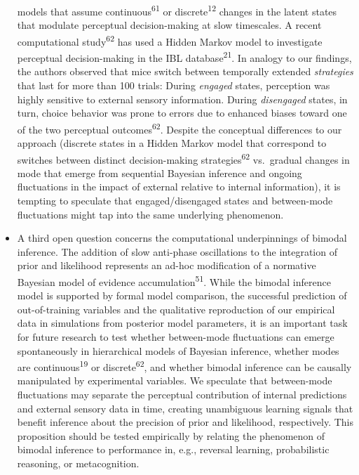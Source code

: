 \documentclass[
]{article}
\begin{document}
\begin{itemize}
  models that assume continuous\textsuperscript{61} or
  discrete\textsuperscript{12} changes in the latent states that
  modulate perceptual decision-making at slow timescales. A recent
  computational study\textsuperscript{62} has used a Hidden Markov model
  to investigate perceptual decision-making in the IBL
  database\textsuperscript{21}. In analogy to our findings, the authors
  observed that mice switch between temporally extended
  \emph{strategies} that last for more than 100 trials: During
  \emph{engaged} states, perception was highly sensitive to external
  sensory information. During \emph{disengaged} states, in turn, choice
  behavior was prone to errors due to enhanced biases toward one of the
  two perceptual outcomes\textsuperscript{62}. Despite the conceptual
  differences to our approach (discrete states in a Hidden Markov model
  that correspond to switches between distinct decision-making
  strategies\textsuperscript{62} vs.~gradual changes in mode that emerge
  from sequential Bayesian inference and ongoing fluctuations in the
  impact of external relative to internal information), it is tempting
  to speculate that engaged/disengaged states and between-mode
  fluctuations might tap into the same underlying phenomenon.
\item
  A third open question concerns the computational underpinnings of
  bimodal inference. The addition of slow anti-phase oscillations to the
  integration of prior and likelihood represents an ad-hoc modification
  of a normative Bayesian model of evidence
  accumulation\textsuperscript{51}. While the bimodal inference model is
  supported by formal model comparison, the successful prediction of
  out-of-training variables and the qualitative reproduction of our
  empirical data in simulations from posterior model parameters, it is
  an important task for future research to test whether between-mode
  fluctuations can emerge spontaneously in hierarchical models of
  Bayesian inference, whether modes are continuous\textsuperscript{19}
  or discrete\textsuperscript{62}, and whether bimodal inference can be
  causally manipulated by experimental variables. We speculate that
  between-mode fluctuations may separate the perceptual contribution of
  internal predictions and external sensory data in time, creating
  unambiguous learning signals that benefit inference about the
  precision of prior and likelihood, respectively. This proposition
  should be tested empirically by relating the phenomenon of bimodal
  inference to performance in, e.g., reversal learning, probabilistic
  reasoning, or metacognition.
\end{itemize}
\end{document}

